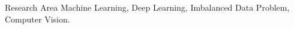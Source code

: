 
\begin{rubric}{Research Area}
Machine Learning, Deep Learning, Imbalanced Data Problem, Computer Vision.
\end{rubric}